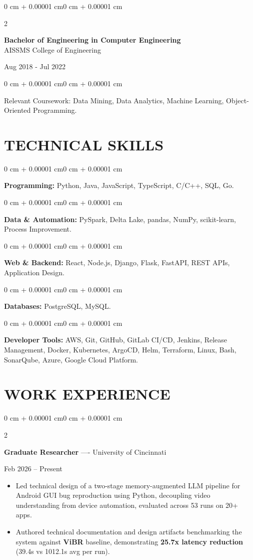 \documentclass[10pt, letterpaper]{article}
\newenvironment{highlights}{
    \begin{itemize}[
        topsep=0.10 cm,
        parsep=0.06 cm,
        partopsep=0pt,
        itemsep=0.06 cm,
        leftmargin=12pt
    ]
}{
    \end{itemize}
}
\newenvironment{onecolentry}{
    \begin{adjustwidth}{0 cm + 0.00001 cm}{0 cm + 0.00001 cm}
}{
    \end{adjustwidth}
}
\newenvironment{twocolentry}[2][]{
    \onecolentry
    \def\secondColumn{#2}
    \setcolumnwidth{\fill, 4.5 cm}
    \begin{paracol}{2}
}{
    \switchcolumn \raggedleft \secondColumn
    \end{paracol}
    \endonecolentry
}
\begin{document}
\begin{twocolentry}{
    Aug 2018 - Jul 2022
}
    \textbf{Bachelor of Engineering in Computer Engineering} \\
    AISSMS College of Engineering
\end{twocolentry}
\begin{onecolentry}
Relevant Coursework: Data Mining, Data Analytics, Machine Learning, Object-Oriented Programming.
\end{onecolentry}
\section{TECHNICAL SKILLS}
\begin{onecolentry}
\textbf{Programming:} Python, Java, JavaScript, TypeScript, C/C++, SQL, Go.
\end{onecolentry}
\vspace{0.06 cm}
\begin{onecolentry}
\textbf{Data \& Automation:} PySpark, Delta Lake, pandas, NumPy, scikit-learn, Process Improvement.
\end{onecolentry}
\vspace{0.06 cm}
\begin{onecolentry}
\textbf{Web \& Backend:} React, Node.js, Django, Flask, FastAPI, REST APIs, Application Design.
\end{onecolentry}
\vspace{0.06 cm}
\begin{onecolentry}
\textbf{Databases:} PostgreSQL, MySQL.
\end{onecolentry}
\vspace{0.06 cm}
\begin{onecolentry}
\textbf{Developer Tools:} AWS, Git, GitHub, GitLab CI/CD, Jenkins, Release Management, Docker, Kubernetes, ArgoCD, Helm, Terraform, Linux, Bash, SonarQube, Azure, Google Cloud Platform.
\end{onecolentry}

\section{WORK EXPERIENCE}
\begin{twocolentry}{Feb 2026 -- Present}
\textbf{Graduate Researcher} ---- University of Cincinnati
\end{twocolentry}
\begin{highlights}
  \item Led technical design of a two-stage memory-augmented LLM pipeline for Android GUI bug reproduction using Python, decoupling video understanding from device automation, evaluated across 53 runs on 20+ apps.
  \item Authored technical documentation and design artifacts benchmarking the system against \textbf{ViBR} baseline, demonstrating \textbf{25.7x latency reduction} (39.4s vs 1012.1s avg per run).
\end{highlights}
\end{document}
